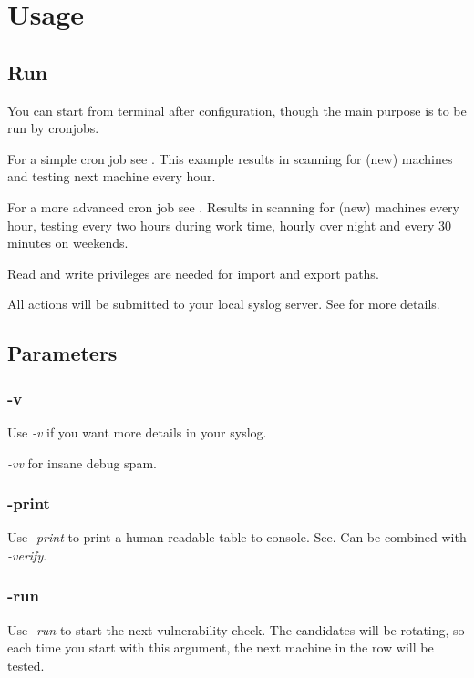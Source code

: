 \section{Usage}

\breakpoint\subsection{Run \sw}

You can start \sw from terminal after configuration, though the main purpose is to be run by cronjobs.

For a simple cron job see . This example results in scanning for (new) machines and testing next machine every hour.


For a more advanced cron job see . Results in scanning for (new) machines every hour, testing every two hours during work time, hourly over night and every 30 minutes on weekends.


\warn Read and write privileges are needed for import and export paths.

\hint All actions will be submitted to your local syslog server. See  for more details.
 

\clearpage
\breakpoint\subsection{Parameters}\label{sec:parameters}

\breakpoint\subsubsection*{-v}\label{sec:verbose}
Use \emph{-v} if you want more details in your syslog.

\emph{-vv} for insane debug spam.

\breakpoint\subsubsection*{-print}\label{sec:print_console}
Use \emph{-print} to print a human readable table to console. See.
Can be combined with \emph{-verify}.

\breakpoint\subsubsection*{-run}
Use \emph{-run} to start the next vulnerability check. The candidates will be rotating, so each time you start \sw with this argument, the next machine in the row will be tested.

